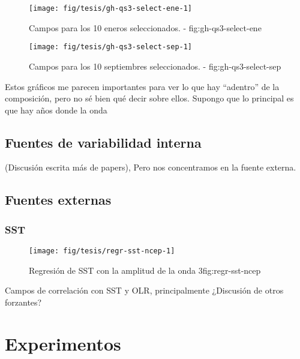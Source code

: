 \documentclass[spanish,a4paper]{book}
\begin{document}
\begin{figure}

{\centering \texttt{[image: fig/tesis/gh-qs3-select-ene-1]} 

}

\caption{Campos para los 10 eneros seleccionados. - fig:gh-qs3-select-ene}\label{fig:gh-qs3-select-ene}
\end{figure}

\begin{figure}

{\centering \texttt{[image: fig/tesis/gh-qs3-select-sep-1]} 

}

\caption{Campos para los 10 septiembres seleccionados. - fig:gh-qs3-select-sep}\label{fig:gh-qs3-select-sep}
\end{figure}

Estos gráficos me parecen importantes para ver lo que hay ``adentro'' de
la composición, pero no sé bien qué decir sobre ellos. Supongo que lo
principal es que hay años donde la onda

\section{Fuentes de variabilidad
interna}\label{fuentes-de-variabilidad-interna}

(Discusión escrita más de papers), Pero nos concentramos en la fuente
externa.

\section{Fuentes externas}\label{fuentes-externas}

\subsection{SST}\label{sst}

\begin{figure}

{\centering \texttt{[image: fig/tesis/regr-sst-ncep-1]} 

}

\caption{Regresión de SST con la amplitud de la onda 3{fig:regr-sst-ncep}}\label{fig:regr-sst-ncep}
\end{figure}

Campos de correlación con SST y OLR, principalmente ¿Discusión de otros
forzantes?

\chapter{Experimentos}\label{experimentos}
\end{document}
